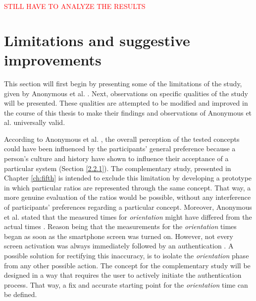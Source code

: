 \textcolor{red}{STILL HAVE TO ANALYZE THE RESULTS}

\section{Limitations and suggestive improvements} \label{3.3}

This section will first begin by presenting some of the limitations of the study, given by Anonymous et al. \cite{anonymous}. Next, observations on specific qualities of the study will be presented. These qualities are attempted to be modified and improved in the course of this thesis to make their findings and observations of Anonymous et al. \cite{anonymous} universally valid.  

According to Anonymous et al. \cite{anonymous}, the overall perception of the tested concepts could have been influenced by the participants' general preference \cite{anonymous} because a person's culture and history have shown to influence their acceptance of a particular system \cite{Harbach:2016} (Section \ref{2.2.1}). The complementary study, presented in Chapter \ref{ch:fifth} is intended to exclude this limitation by developing a prototype in which particular ratios are represented through the same concept. That way, a more genuine evaluation of the ratios would be possible, without any interference of participants' preferences regarding a particular concept. Moreover, Anonymous et al. \cite{anonymous} stated that the measured times for \textit{orientation} might have differed from the actual times \cite{anonymous}. Reason being that the measurements for the \textit{orientation} times began as soon as the smartphone screen was turned on. However, not every screen activation was always immediately followed by an authentication \cite{anonymous}. A possible solution for rectifying this inaccuracy, is to isolate the \textit{orientation} phase from any other possible action. The concept for the complementary study will be designed in a way that requires the user to actively initiate the authentication process. That way, a fix and accurate starting point for the \textit{orientation} time can be defined.\\

